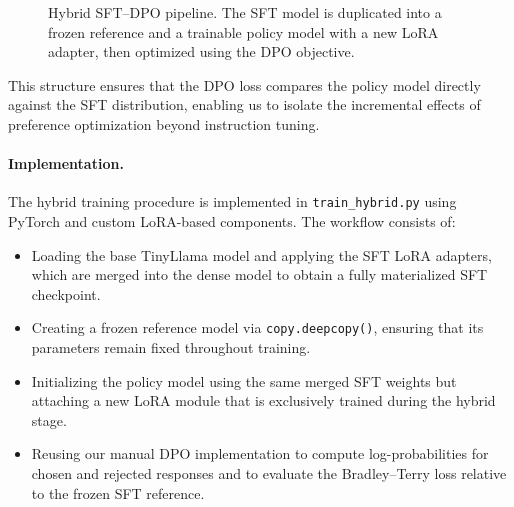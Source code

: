\documentclass[11pt,a4paper]{article}
\begin{document}
\begin{figure}[t]
    \centering
    \caption{Hybrid SFT--DPO pipeline. The SFT model is duplicated into a frozen reference and a trainable policy model with a new LoRA adapter, then optimized using the DPO objective.}
    \label{fig:hybrid-pipeline}
\end{figure}

This structure ensures that the DPO loss compares the policy model directly against the SFT distribution, enabling us to isolate the incremental effects of preference optimization beyond instruction tuning.

\paragraph{Implementation.}
The hybrid training procedure is implemented in \texttt{train\_hybrid.py} using PyTorch and custom LoRA-based components. The workflow consists of:
\begin{itemize}
    \item Loading the base TinyLlama model and applying the SFT LoRA adapters, which are merged into the dense model to obtain a fully materialized SFT checkpoint.
    \item Creating a frozen reference model via \texttt{copy.deepcopy()}, ensuring that its parameters remain fixed throughout training.
    \item Initializing the policy model using the same merged SFT weights but attaching a new LoRA module that is exclusively trained during the hybrid stage.
    \item Reusing our manual DPO implementation to compute log-probabilities for chosen and rejected responses and to evaluate the Bradley--Terry loss relative to the frozen SFT reference.
\end{itemize}
\end{document}
